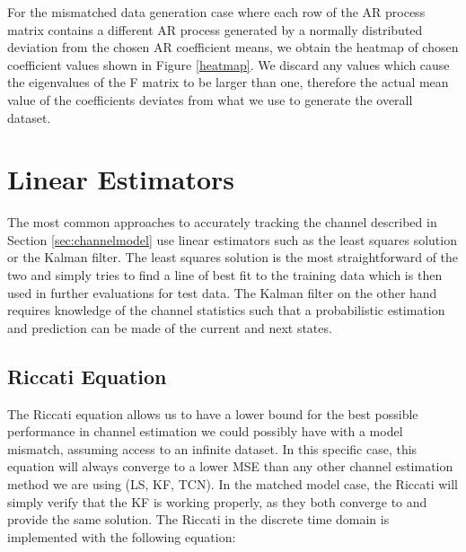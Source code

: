\documentclass[twocolumn,letterpaper]{IEEEAerospaceCLS}  %
\begin{document}


For the mismatched data generation case where each row of the AR process matrix contains a different AR process generated by a normally distributed deviation from the chosen AR coefficient means, we obtain the heatmap of chosen coefficient values shown in Figure \ref{heatmap}. We discard any values which cause the eigenvalues of the F matrix to be larger than one, therefore the actual mean value of the coefficients deviates from what we use to generate the overall dataset. 





\section{Linear Estimators}
\label{sec:linest}

The most common approaches to accurately tracking the channel described in Section \ref{sec:channelmodel} use linear estimators such as the least squares solution or the Kalman filter. The least squares solution is the most straightforward of the two and simply tries to find a line of best fit to the training data which is then used in further evaluations for test data. The Kalman filter on the other hand requires knowledge of the channel statistics such that a probabilistic estimation and prediction can be made of the current and next states. 

\subsection{Riccati Equation}


The Riccati equation allows us to have a lower bound for the best possible performance in channel estimation we could possibly have with a model mismatch, assuming access to an infinite dataset. In this specific case, this equation will always converge to a lower MSE than any other channel estimation method we are using (LS, KF, TCN). In the matched model case, the Riccati will simply verify that the KF is working properly, as they both converge to and provide the same solution. The Riccati in the discrete time domain is implemented with the following equation: 
\end{document}
